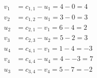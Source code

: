 \[
\begin{aligned}
v_{1} &= c_{1,1} - u_{1} = 4 - 0 = 4 \\
v_{2} &= c_{1,2} - u_{1} = 3 - 0 = 3 \\
u_{2} &= c_{2,1} - v_{1} = 6 - 4 = 2 \\
v_{3} &= c_{2,3} - u_{2} = 5 - 2 = 3 \\
u_{4} &= c_{4,1} - v_{1} = 1 - 4 = -3 \\
v_{4} &= c_{4,4} - u_{4} = 4 - -3 = 7 \\
u_{3} &= c_{3,4} - v_{4} = 5 - 7 = -2 \\
\end{aligned}
\]

